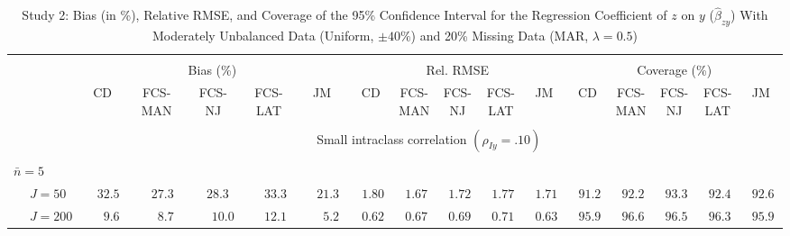 \begin{sidewaystable}
\begin{threeparttable}
\setlength{\tabcolsep}{1.0pt}
\renewcommand{\arraystretch}{0.95}
\footnotesize
\caption{\small Study 2: Bias (in \%), Relative RMSE, and Coverage of the 95\% Confidence Interval for the Regression Coefficient of $z$ on $y$ ($\hat\beta_{zy}$) With Moderately Unbalanced Data (Uniform, $\pm 40\%$) and 20\% Missing Data (MAR, $\lambda=0.5$)}
\begin{tabular}{llccccccccccccccc}
\hline\\[-1.8ex]
& & \multicolumn{5}{c}{Bias (\%)} & \multicolumn{5}{c}{Rel. RMSE} & \multicolumn{5}{c}{Coverage (\%)} \\ \cmidrule(r){3-7}\cmidrule(r){8-12}\cmidrule(r){13-17}
 &  & CD & \makecell{FCS-\\MAN} & \makecell{FCS-\\NJ} & \makecell{FCS-\\LAT} & JM & CD & \makecell{FCS-\\MAN} & \makecell{FCS-\\NJ} & \makecell{FCS-\\LAT} & JM & CD & \makecell{FCS-\\MAN} & \makecell{FCS-\\NJ} & \makecell{FCS-\\LAT} & \multicolumn{1}{c}{JM} \\ 
[0.4ex]\hline\\[-1.8ex]
& & \multicolumn{15}{c}{Small intraclass correlation $(\rho_{Iy}=.10)$} \\[0.6ex]\hline\\[-1.8ex]
\multicolumn{4}{l}{$\bar{n}=5$} \\  & \nopagebreak $\;J=50$  & $\phantom{-}32.5\phantom{0}$ & $\phantom{-}27.3\phantom{0}$ & $\phantom{-}28.3\phantom{0}$ & $\phantom{-}33.3\phantom{0}$ & $\phantom{-}21.3\phantom{0}$ & $\phantom{0}1.80\phantom{0}$ & $\phantom{0}1.67\phantom{0}$ & $\phantom{0}1.72\phantom{0}$ & $\phantom{0}1.77\phantom{0}$ & $\phantom{0}1.71\phantom{0}$ & $\phantom{0}91.2\phantom{0}$ & $\phantom{0}92.2\phantom{0}$ & $\phantom{0}93.3\phantom{0}$ & $\phantom{0}92.4\phantom{0}$ & $\phantom{0}92.6\phantom{0}$ \\
 & \nopagebreak $\;J=200$  & $\phantom{0}\phantom{-}9.6\phantom{0}$ & $\phantom{0}\phantom{-}8.7\phantom{0}$ & $\phantom{0}\phantom{-}10.0\phantom{0}$ & $\phantom{-}12.1\phantom{0}$ & $\phantom{0}\phantom{-}5.2\phantom{0}$ & $\phantom{0}0.62\phantom{0}$ & $\phantom{0}0.67\phantom{0}$ & $\phantom{0}0.69\phantom{0}$ & $\phantom{0}0.71\phantom{0}$ & $\phantom{0}0.63\phantom{0}$ & $\phantom{0}95.9\phantom{0}$ & $\phantom{0}96.6\phantom{0}$ & $\phantom{0}96.5\phantom{0}$ & $\phantom{0}96.3\phantom{0}$ & $\phantom{0}95.9\phantom{0}$ \\

\end{tabular}
\end{threeparttable}
\end{sidewaystable}
